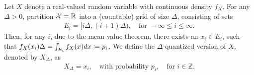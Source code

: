             \begin{definition}
                \label{def:quantized-rv-1}
                Let $X$ denote a real-valued random variable with continuous density $f_X$. For any $\Delta>0$, partition $\mathcal{X} =\mathbb{R}$ into a (countable) grid of size $\Delta$, consisting of sets
                \begin{align}
                    E_i = [i\Delta, (i+1)\Delta), \quad \text{for } -\infty \leq i \leq \infty. 
                \end{align}
                Then, for any $i$, due to the mean-value theorem, there exists an $x_i \in E_i$, such that $f_X(x_i) \Delta = \int_{E_i} f_X(x) dx \coloneqq p_i$. We define the $\Delta$-quantized version of $X$, denoted by $X_\Delta$, as 
                \begin{align}
                    X_\Delta = x_i, \quad \text{with probability } p_i, \quad \text{for } i \in \mathbb{Z}. 
                \end{align}
            \end{definition}

